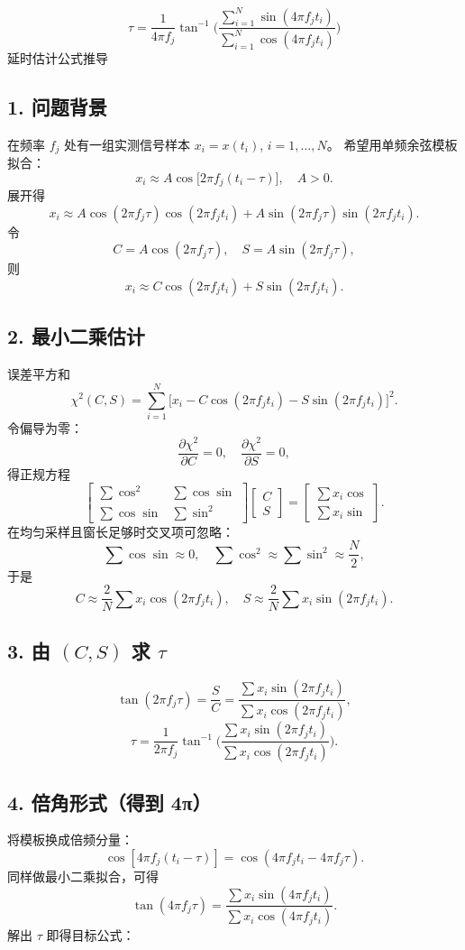 \documentclass[withoutpreface,bwprint]{cumcmthesis}
\begin{document}
\[
\tau=\frac{1}{4\pi f_j}\tan^{-1}\!\biggl(
\frac{\displaystyle\sum_{i=1}^{N}\sin(4\pi f_j t_i)}
{\displaystyle\sum_{i=1}^{N}\cos(4\pi f_j t_i)}
\biggr)
\]
{延时估计公式推导}
\subsection*{1. 问题背景}

在频率 $f_j$ 处有一组实测信号样本 $x_i=x(t_i)$, $i=1,\dots,N$。  
希望用单频余弦模板拟合：
\[
x_i\approx A\cos\!\bigl[2\pi f_j(t_i-\tau)\bigr],\quad A>0.
\]
展开得
\[
x_i\approx A\cos(2\pi f_j\tau)\cos(2\pi f_j t_i)
+ A\sin(2\pi f_j\tau)\sin(2\pi f_j t_i).
\]
令
\[
C=A\cos(2\pi f_j\tau),\quad S=A\sin(2\pi f_j\tau),
\]
则
\[
x_i\approx C\cos(2\pi f_j t_i)+S\sin(2\pi f_j t_i).
\]

\subsection*{2. 最小二乘估计}
误差平方和
\[
\chi^2(C,S)=\sum_{i=1}^{N}
\bigl[x_i-C\cos(2\pi f_j t_i)-S\sin(2\pi f_j t_i)\bigr]^2.
\]
令偏导为零：
\[
\frac{\partial\chi^2}{\partial C}=0,\quad
\frac{\partial\chi^2}{\partial S}=0,
\]
得正规方程
\[
\begin{bmatrix}
\sum\cos^2 & \sum\cos\sin\\[2mm]
\sum\cos\sin & \sum\sin^2
\end{bmatrix}
\begin{bmatrix}
C\\ S
\end{bmatrix}
=
\begin{bmatrix}
\sum x_i\cos\\[2mm]
\sum x_i\sin
\end{bmatrix}.
\]
在均匀采样且窗长足够时交叉项可忽略：
\[
\sum\cos\sin\approx 0,\quad
\sum\cos^2\approx\sum\sin^2\approx\frac{N}{2},
\]
于是
\[
C\approx\frac{2}{N}\sum x_i\cos(2\pi f_j t_i),\quad
S\approx\frac{2}{N}\sum x_i\sin(2\pi f_j t_i).
\]

\subsection*{3. 由 $(C,S)$ 求 $\tau$}
\[
\tan(2\pi f_j\tau)=\frac{S}{C}
=\frac{\displaystyle\sum x_i\sin(2\pi f_j t_i)}
{\displaystyle\sum x_i\cos(2\pi f_j t_i)},
\]
\[
\tau=\frac{1}{2\pi f_j}\tan^{-1}\!\biggl(
\frac{\displaystyle\sum x_i\sin(2\pi f_j t_i)}
{\displaystyle\sum x_i\cos(2\pi f_j t_i)}
\biggr).
\]

\subsection*{4. 倍角形式（得到 4π）}
将模板换成倍频分量：
\[
\cos[4\pi f_j(t_i-\tau)]
=\cos(4\pi f_j t_i-4\pi f_j\tau).
\]
同样做最小二乘拟合，可得
\[
\tan(4\pi f_j\tau)
=\frac{\displaystyle\sum x_i\sin(4\pi f_j t_i)}
{\displaystyle\sum x_i\cos(4\pi f_j t_i)}.
\]
解出 $\tau$ 即得目标公式：
\end{document}
